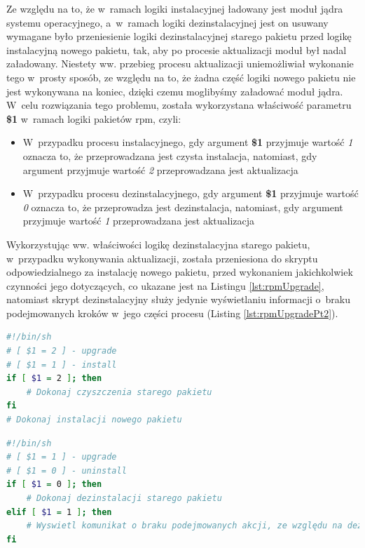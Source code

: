 Ze względu na to, że w~ramach logiki instalacyjnej ładowany jest moduł jądra systemu operacyjnego, a~w~ramach logiki dezinstalacyjnej jest on usuwany wymagane było przeniesienie logiki dezinstalacyjnej starego pakietu przed logikę instalacyjną nowego pakietu, tak, aby po procesie aktualizacji moduł był nadal załadowany. Niestety ww. przebieg procesu aktualizacji uniemożliwiał wykonanie tego w~prosty sposób, ze względu na to, że żadna część logiki nowego pakietu nie jest wykonywana na koniec, dzięki czemu moglibyśmy załadować moduł jądra. W~celu rozwiązania tego problemu, została wykorzystana właściwość parametru \textbf{\$1} w~ramach logiki pakietów \gls*{rpm}, czyli:
\begin{itemize}
\item W~przypadku procesu instalacyjnego, gdy argument \textbf{\$1} przyjmuje wartość \textit{1} oznacza to, że przeprowadzana jest czysta instalacja, natomiast, gdy argument przyjmuje wartość \textit{2} przeprowadzana jest aktualizacja
\item W~przypadku procesu dezinstalacyjnego, gdy argument \textbf{\$1} przyjmuje wartość \textit{0} oznacza to, że przeprowadza jest dezinstalacja, natomiast, gdy argument przyjmuje wartość \textit{1} przeprowadzana jest aktualizacja
\end{itemize}

Wykorzystując ww. właściwości logikę dezinstalacyjna starego pakietu, w~przypadku wykonywania aktualizacji, została przeniesiona do skryptu odpowiedzialnego za instalację nowego pakietu, przed wykonaniem jakichkolwiek czynności jego dotyczących, co ukazane jest na Listingu \ref{lst:rpmUpgrade}, natomiast skrypt dezinstalacyjny służy jedynie wyświetlaniu informacji o~braku podejmowanych kroków w~jego części procesu (Listing \ref{lst:rpmUpgradePt2}).

\begin{lstlisting}[language=bash, caption={Przykład wykorzystania właściwości argumentów dla skryptu \textit{post-install}}, label={lst:rpmUpgrade}]
#!/bin/sh
# [ $1 = 2 ] - upgrade
# [ $1 = 1 ] - install
if [ $1 = 2 ]; then
    # Dokonaj czyszczenia starego pakietu
fi
# Dokonaj instalacji nowego pakietu
\end{lstlisting}

\begin{lstlisting}[language=bash, caption={Przykład wykorzystania właściwości argumentów dla skryptu \textit{pre-uninstall}}, label={lst:rpmUpgradePt2}]
#!/bin/sh
# [ $1 = 1 ] - upgrade
# [ $1 = 0 ] - uninstall
if [ $1 = 0 ]; then
    # Dokonaj dezinstalacji starego pakietu
elif [ $1 = 1 ]; then
    # Wyswietl komunikat o braku podejmowanych akcji, ze względu na dezinstalację wykonaną przez skrypt post-install
fi

\end{lstlisting}

